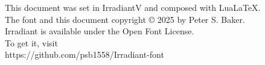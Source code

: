 \documentclass[12pt]{book}
\begin{document}
\vfill
\hrulefill
\begin{center}\normalsize
This document was set in IrradiantV and composed with LuaLaTeX.\\
The font and this document copyright © 2025 by Peter S. Baker.\\
Irradiant is available under the Open Font License.\\
To get it, visit\\
https:\slash\slash github.com\slash psb1558\slash Irradiant-font
\end{center}
\end{document}
